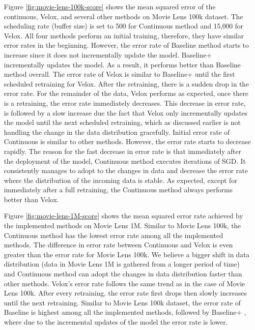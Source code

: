 \documentclass{vldb}
\begin{document}
Figure \ref{fig:movie-lens-100k-score} shows the mean squared error of the continuous, Velox, and several other methods on Movie Lens 100k dataset.
The scheduling rate (buffer size) is set to 500 for Continuous method and 15,000 for Velox.
All four methods perform an initial training, therefore, they have similar error rates in the beginning.
However, the error rate of Baseline method starts to increase since it does not incrementally update the model.
Baseline+ incrementally updates the model.
As a result, it performs better than Baseline method overall.
The error rate of Velox is similar to Baseline+ until the first scheduled retraining for Velox.
After the retraining, there is a sudden drop in the error rate.
For the remainder of the data, Velox performs as expected, once there is a retraining, the error rate immediately decreases.
This decrease in error rate, is followed by a slow increase due the fact that Velox only incrementally updates the model until the next scheduled retraining, which as discussed earlier is not handling the change in the data distribution gracefully.
Initial error rate of Continuous is similar to other methods.
However, the error rate starts to decrease rapidly.
The reason for the fast decrease in error rate is that immediately after the deployment of the model, Continuous method executes iterations of SGD.
It consistently manages to adopt to the changes in data and decrease the error rate where the distribution of the incoming data is stable.
As expected, except for immediately after a full retraining, the Continuous method always performs better than Velox.

Figure \ref{fig:movie-lens-1M-score} shows the mean squared error rate achieved by the implemented methods on Movie Lens 1M.
Similar to Movie Lens 100k, the Continuous method has the lowest error rate among all the implemented methods.
The difference in error rate between Continuous and Velox is even greater than the error rate for Movie Lens 100k.
We believe a bigger shift in data distribution (data in Movie Lens 1M is gathered from a longer period of time) and Continuous method can adopt the changes in data distribution faster than other methods.
Velox's error rate follows the same trend as in the case of Movie Lens 100k. 
After every retraining, the error rate first drops then slowly increases until the next retraining.
Similar to Movie Lens 100k dataset, the error rate of Baseline is highest among all the implemented methods, followed by Baseline+ , where due to the incremental updates of the model the error rate is lower.
\end{document}
